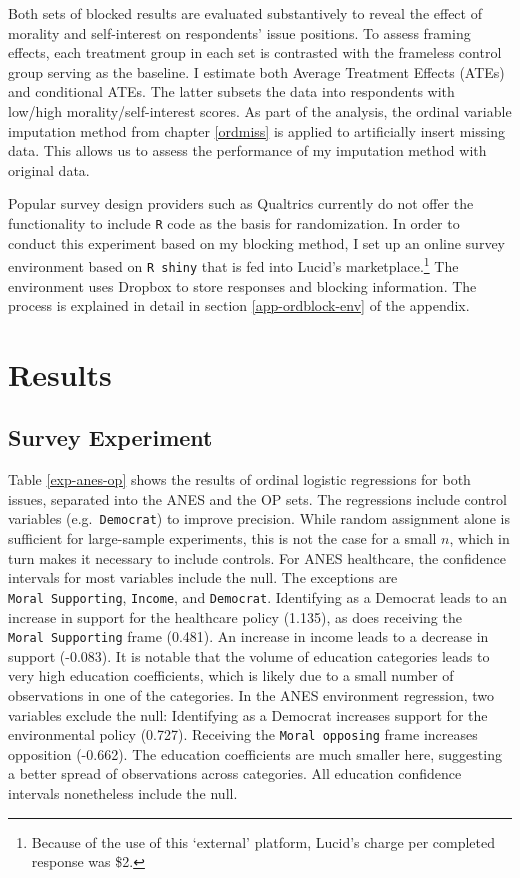 \documentclass[12pt,econ]{sources/authesis}
\begin{document}
Both sets of blocked results are evaluated substantively to reveal the effect of morality and self-interest on respondents' issue positions. To assess framing effects, each treatment group in each set is contrasted with the frameless control group serving as the baseline. I estimate both Average Treatment Effects (ATEs) and conditional ATEs. The latter subsets the data into respondents with low/high morality/self-interest scores. As part of the analysis, the ordinal variable imputation method from chapter \ref{ordmiss} is applied to artificially insert missing data. This allows us to assess the performance of my imputation method with original data.

Popular survey design providers such as Qualtrics currently do not offer the functionality to include \texttt{R} code as the basis for randomization. In order to conduct this experiment based on my blocking method, I set up an online survey environment based on \texttt{R\ shiny} that is fed into Lucid's marketplace.\footnote{Because of the use of this `external' platform, Lucid's charge per completed response was \$2.} The environment uses Dropbox to store responses and blocking information. The process is explained in detail in section \ref{app-ordblock-env} of the appendix.

\hypertarget{framing-results}{%
\section{Results}\label{framing-results}}

\hypertarget{framing-results-experiment}{%
\subsection{Survey Experiment}\label{framing-results-experiment}}

Table \ref{exp-anes-op} shows the results of ordinal logistic regressions for both issues, separated into the ANES and the OP sets. The regressions include control variables (e.g.~\texttt{Democrat}) to improve precision. While random assignment alone is sufficient for large-sample experiments, this is not the case for a small \(n\), which in turn makes it necessary to include controls. For ANES healthcare, the confidence intervals for most variables include the null. The exceptions are \texttt{Moral\ Supporting}, \texttt{Income}, and \texttt{Democrat}. Identifying as a Democrat leads to an increase in support for the healthcare policy (1.135), as does receiving the \texttt{Moral\ Supporting} frame (0.481). An increase in income leads to a decrease in support (-0.083). It is notable that the volume of education categories leads to very high education coefficients, which is likely due to a small number of observations in one of the categories. In the ANES environment regression, two variables exclude the null: Identifying as a Democrat increases support for the environmental policy (0.727). Receiving the \texttt{Moral\ opposing} frame increases opposition (-0.662). The education coefficients are much smaller here, suggesting a better spread of observations across categories. All education confidence intervals nonetheless include the null.
\end{document}
